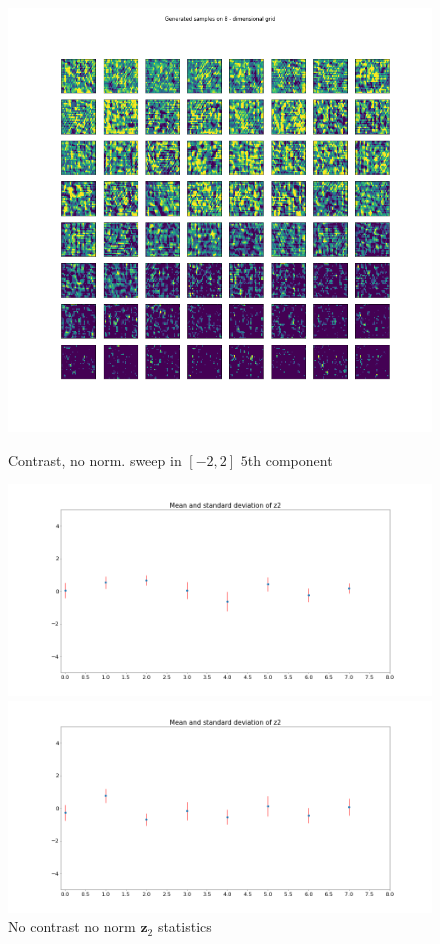 \documentclass[12pt, english]{article}
\begin{document}
\begin{figure}[H]
\begin{minipage}[b]{0.33\linewidth}
  \end{minipage} 
  \begin{minipage}[b]{0.33\linewidth}
    \centering
    \includegraphics[width=.72\linewidth]{sweep/no_norm_contrast_sweep_minus_two_to_two_5th_param.png} 
    \caption{Contrast, no norm. \newline sweep in $[-2, 2]$ $5$th component} 
    \label{fig:contrast-no-norm-sweep-5}
  \end{minipage}
  \begin{minipage}[b]{0.5\linewidth}
    \centering
    \includegraphics[width=.95\linewidth]{sweep/no_contrast_no_norm_z2_stats.png} 
    \caption{No contrast \newline no norm $\bm{z}_{2}$ statistics} 
    \label{fig:no-contrast-no-norm-stats}
  \end{minipage} 
  \begin{minipage}[b]{0.5\linewidth}
    \centering
    \includegraphics[width=.95\linewidth]{sweep/contrast_no_norm_z2_stats.png} 

\end{minipage}
\end{figure}
\end{document}
